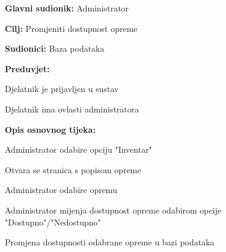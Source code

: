 				
				\noindent {}
				\begin{packed_item}
					
					\item \textbf{Glavni sudionik: }Administrator
					\item  \textbf{Cilj: }Promjeniti dostupnost opreme
					\item  \textbf{Sudionici: }Baza podataka
					\item  \textbf{Preduvjet: }
					\item[] \begin{packed_enum}
						
						\item[-] Djelatnik je prijavljen u sustav
						\item[-] Djelatnik ima ovlasti administratora
					\end{packed_enum}
					\item  \textbf{Opis osnovnog tijeka: }
					
					\item[] \begin{packed_enum}
						\item Administrator odabire opciju "Inventar"
						\item Otvara se stranica s popisom opreme
						\item Administrator odabire opremu
						\item Administrator mijenja dostupnost opreme odabirom opcije "Dostupno"/"Nedostupno"
						\item Promjena dostupnosti odabrane opreme u bazi podataka
					\end{packed_enum}
					
				\end{packed_item}
				
